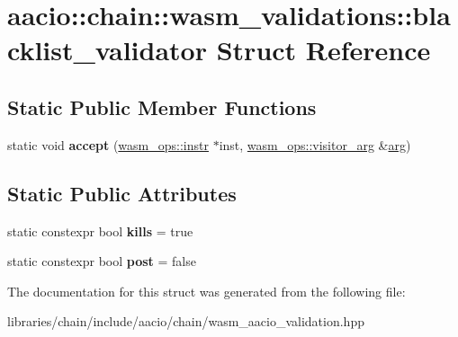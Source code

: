 \hypertarget{structaacio_1_1chain_1_1wasm__validations_1_1blacklist__validator}{}\section{aacio\+:\+:chain\+:\+:wasm\+\_\+validations\+:\+:blacklist\+\_\+validator Struct Reference}
\label{structaacio_1_1chain_1_1wasm__validations_1_1blacklist__validator}
\subsection*{Static Public Member Functions}
\begin{DoxyCompactItemize}
\item 
\mbox{\label{structaacio_1_1chain_1_1wasm__validations_1_1blacklist__validator_ac281278781a9900f59a45f9d60a368c1}} 
static void {\bfseries accept} (\mbox{\hyperlink{structaacio_1_1chain_1_1wasm__ops_1_1instr}{wasm\+\_\+ops\+::instr}} $\ast$inst, \mbox{\hyperlink{structaacio_1_1chain_1_1wasm__ops_1_1visitor__arg}{wasm\+\_\+ops\+::visitor\+\_\+arg}} \&\mbox{\hyperlink{unionarg}{arg}})
\end{DoxyCompactItemize}
\subsection*{Static Public Attributes}
\begin{DoxyCompactItemize}
\item 
\mbox{\label{structaacio_1_1chain_1_1wasm__validations_1_1blacklist__validator_a08153d6305752409e8c4bd3cb79b34b8}} 
static constexpr bool {\bfseries kills} = true
\item 
\mbox{\label{structaacio_1_1chain_1_1wasm__validations_1_1blacklist__validator_ac79c983615f685de1cd4fac9506bbbbc}} 
static constexpr bool {\bfseries post} = false
\end{DoxyCompactItemize}


The documentation for this struct was generated from the following file\+:\begin{DoxyCompactItemize}
\item 
libraries/chain/include/aacio/chain/wasm\+\_\+aacio\+\_\+validation.\+hpp\end{DoxyCompactItemize}
